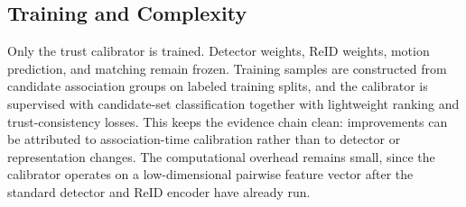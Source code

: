 \subsection{Training and Complexity}
Only the trust calibrator is trained. Detector weights, ReID weights, motion prediction, and matching remain frozen. Training samples are constructed from candidate association groups on labeled training splits, and the calibrator is supervised with candidate-set classification together with lightweight ranking and trust-consistency losses. This keeps the evidence chain clean: improvements can be attributed to association-time calibration rather than to detector or representation changes. The computational overhead remains small, since the calibrator operates on a low-dimensional pairwise feature vector after the standard detector and ReID encoder have already run.
